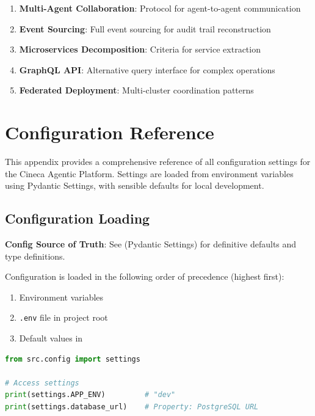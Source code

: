 \documentclass[a4paper,twoside]{sapthesis}
\begin{document}
\begin{enumerate}
    \item \textbf{Multi-Agent Collaboration}: Protocol for agent-to-agent communication
    \item \textbf{Event Sourcing}: Full event sourcing for audit trail reconstruction
    \item \textbf{Microservices Decomposition}: Criteria for service extraction
    \item \textbf{GraphQL API}: Alternative query interface for complex operations
    \item \textbf{Federated Deployment}: Multi-cluster coordination patterns
\end{enumerate}


\chapter{Configuration Reference}
\label{app:config-reference}

This appendix provides a comprehensive reference of all configuration settings for the Cineca Agentic Platform. Settings are loaded from environment variables using Pydantic Settings, with sensible defaults for local development.

\section{Configuration Loading}
\label{app:config:loading}

\textbf{Config Source of Truth}: See  (Pydantic Settings) for definitive defaults and type definitions.

Configuration is loaded in the following order of precedence (highest first):
\begin{enumerate}
    \item Environment variables
    \item \texttt{.env} file in project root
    \item Default values in 
\end{enumerate}

\begin{lstlisting}[language=Python]
from src.config import settings

# Access settings
print(settings.APP_ENV)         # "dev"
print(settings.database_url)    # Property: PostgreSQL URL
\end{lstlisting}
\end{document}
